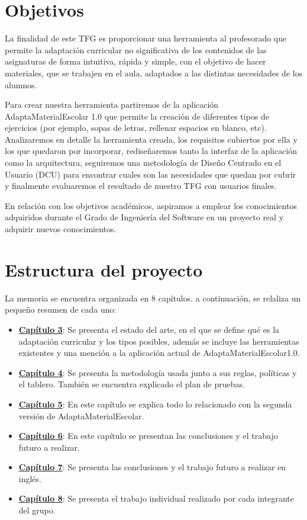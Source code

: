 \section{Objetivos}\label{cap:objetivos}
La finalidad de este TFG es proporcionar una herramienta al profesorado que permite la adaptación curricular no significativa de los contenidos de las asignaturas de forma intuitiva, rápida y simple, con el objetivo de hacer materiales, que se trabajen en el aula, adaptados a las distintas necesidades de los alumnos.

Para crear nuestra herramienta partiremos de la aplicación AdaptaMaterialEscolar 1.0  que permite la creación de diferentes tipos de ejercicios (por ejemplo, sopas de letras, rellenar espacios en blanco, etc). Analizaremos en detalle la herramienta creada, los requisitos cubiertos por ella y los que quedaron por incorporar, rediseñaremos tanto la interfaz de la aplicación como la arquitectura, seguiremos una metodología de Diseño Centrado en el Usuario (DCU) para encontrar cuales son las necesidades que quedan por cubrir y finalmente evaluaremos el resultado de nuestro TFG con usuarios finales.
 
En relación con los objetivos académicos, aspiramos a emplear los conocimientos adquiridos durante el Grado de Ingeniería del Software en un proyecto real y adquirir nuevos conocimientos.



\section{Estructura del proyecto}\label{cap:estructura}
La memoria se encuentra organizada en 8 capítulos. a continuación, se relaliza un pequeño resumen de cada uno:
\begin{itemize}
    \item \textbf{\hyperref[cap:estadoDelArte]{Capítulo 3}}: Se presenta el estado del arte, en el que se define qué es la adaptación curricular y los tipos posibles, además se incluye las herramientas existentes y una mención a la aplicación actual de  AdaptaMaterialEscolar1.0.
    \item \textbf{\hyperref[cap:metodologia]{Capítulo 4}}: Se presenta la metodología usada junto a sus reglas, políticas y el tablero. También se encuentra explicado el plan de pruebas.
    \item \textbf{\hyperref[cap:AdaptaMaterialEscolar2.0]{Capítulo 5}}: En este capítulo se explica todo lo relacionado con la segunda versión de AdaptaMaterialEscolar.
    \item \textbf{\hyperref[cap:conclusiones]{Capítulo 6}}: En este capítulo se presentan las conclusiones y el trabajo futuro a realizar.
    \item \textbf{\hyperref[cap:conclusions]{Capítulo 7}}: Se presenta las conclusiones y el trabajo futuro a realizar en inglés.
    \item \textbf{\hyperref[cap:TrabajoIndividual]{Capítulo 8}}: Se presenta el trabajo individual realizado por cada integrante del grupo.
\end{itemize}